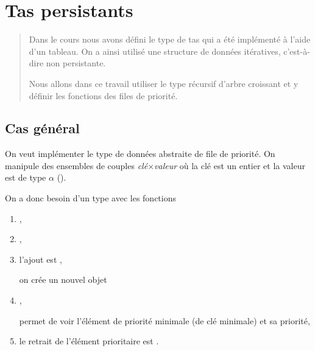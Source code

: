 \chapter{Tas persistants}
\thispagestyle{empty}
\begin{abstract}
Dans le cours nous avons défini le type de tas qui a été implémenté à l'aide d'un tableau. On a ainsi utilisé une structure de données itératives, c'est-à-dire non persistante.

Nous allons dans ce travail utiliser le type récursif d'arbre croissant et y définir les fonctions des files de priorité.
\end{abstract}
\section{Cas général}
On veut implémenter le type de données abstraite de file de priorité. On manipule des ensembles de couples {\it clé$\times$valeur} où la clé est un entier et la valeur est de type $\alpha$ ().

On a donc besoin d'un type  avec les fonctions
\begin{enumerate}
\item {},
\item {},
\item l'ajout est , 

 on crée un nouvel objet
\item {} ,

permet de voir l'élément de priorité minimale (de clé minimale) et sa priorité,
\item le retrait de l'élément prioritaire est .
\end{enumerate}

